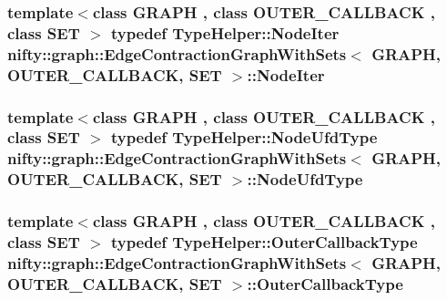 \subsubsection[{Node\+Iter}]{\setlength{\rightskip}{0pt plus 5cm}template$<$class G\+R\+A\+P\+H , class O\+U\+T\+E\+R\+\_\+\+C\+A\+L\+L\+B\+A\+C\+K , class S\+E\+T $>$ typedef {\bf Type\+Helper\+::\+Node\+Iter} {\bf nifty\+::graph\+::\+Edge\+Contraction\+Graph\+With\+Sets}$<$ G\+R\+A\+P\+H, O\+U\+T\+E\+R\+\_\+\+C\+A\+L\+L\+B\+A\+C\+K, S\+E\+T $>$\+::{\bf Node\+Iter}}\label{classnifty_1_1graph_1_1EdgeContractionGraphWithSets_af9e889455b883d034bf708a0b5b05bee}
\hypertarget{classnifty_1_1graph_1_1EdgeContractionGraphWithSets_ae340ffb867bc1eb19b139e879174607e}{}
\subsubsection[{Node\+Ufd\+Type}]{\setlength{\rightskip}{0pt plus 5cm}template$<$class G\+R\+A\+P\+H , class O\+U\+T\+E\+R\+\_\+\+C\+A\+L\+L\+B\+A\+C\+K , class S\+E\+T $>$ typedef {\bf Type\+Helper\+::\+Node\+Ufd\+Type} {\bf nifty\+::graph\+::\+Edge\+Contraction\+Graph\+With\+Sets}$<$ G\+R\+A\+P\+H, O\+U\+T\+E\+R\+\_\+\+C\+A\+L\+L\+B\+A\+C\+K, S\+E\+T $>$\+::{\bf Node\+Ufd\+Type}}\label{classnifty_1_1graph_1_1EdgeContractionGraphWithSets_ae340ffb867bc1eb19b139e879174607e}
\hypertarget{classnifty_1_1graph_1_1EdgeContractionGraphWithSets_a2f741cfabfa1fb4c5bfc75df557c1d12}{}
\subsubsection[{Outer\+Callback\+Type}]{\setlength{\rightskip}{0pt plus 5cm}template$<$class G\+R\+A\+P\+H , class O\+U\+T\+E\+R\+\_\+\+C\+A\+L\+L\+B\+A\+C\+K , class S\+E\+T $>$ typedef {\bf Type\+Helper\+::\+Outer\+Callback\+Type} {\bf nifty\+::graph\+::\+Edge\+Contraction\+Graph\+With\+Sets}$<$ G\+R\+A\+P\+H, O\+U\+T\+E\+R\+\_\+\+C\+A\+L\+L\+B\+A\+C\+K, S\+E\+T $>$\+::{\bf Outer\+Callback\+Type}}\label{classnifty_1_1graph_1_1EdgeContractionGraphWithSets_a2f741cfabfa1fb4c5bfc75df557c1d12}
\hypertarget{classnifty_1_1graph_1_1EdgeContractionGraphWithSets_aeb3c8839879c1e126ceaca6bdfdff008}{}
